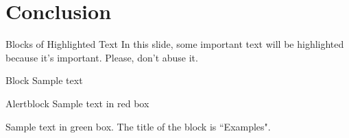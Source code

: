 \documentclass[aspectratio=169,xcolor=dvipsnames]{beamer}
\begin{document}
\section{Conclusion}





\begin{frame}{Blocks of Highlighted Text}
    In this slide, some important text will be \alert{highlighted} because it's important. Please, don't abuse it.

    \begin{block}{Block}
        Sample text
    \end{block}

    \begin{alertblock}{Alertblock}
        Sample text in red box
    \end{alertblock}

    \begin{examples}
        Sample text in green box. The title of the block is ``Examples".
    \end{examples}
\end{frame}

\end{document}
